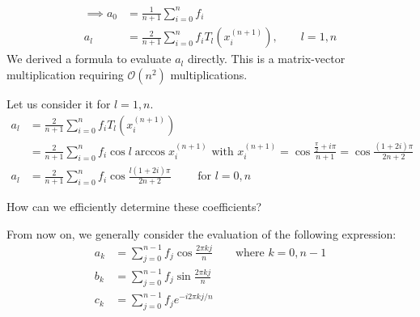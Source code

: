 \documentclass{article}
\begin{document}
\begin{align*}
  \implies a_0 &= \frac{1}{n+1} \sum_{i=0}^n f_i \\
  a_l &= \frac{2}{n+1} \sum_{i=0}^n f_i T_l(x_i^{(n+1)}), \qquad l = 1,n
\end{align*}
We derived a formula to evaluate $a_l$ directly.
This is a matrix-vector multiplication requiring $\mathcal O(n^2)$ multiplications.

Let us consider it for $l=1,n$.
\begin{align*}
  a_l &= \frac{2}{n+1} \sum_{i=0}^n f_i T_l(x_i^{(n+1)}) \\
   &= \frac{2}{n+1} \sum_{i=0}^n f_i \cos{l} \arccos{x_i^{(n+1)}} \text{ with } x_i^{(n+1)} = \cos{\frac{\frac\pi2 + i\pi}{n+1}} = \cos\frac{(1 + 2i)\pi}{2n+2} \\
   a_l &= \frac{2}{n+1} \sum_{i=0}^n f_i \cos\frac{l(1 + 2i)\pi}{2n+2} \qquad \text{ for } l = 0,n
\end{align*}

How can we efficiently determine these coefficients?

From now on, we generally consider the evaluation of the following expression:
\begin{align*}
  a_k &= \sum_{j=0}^{n-1} f_j \cos\frac{2\pi kj}{n} \qquad \text{where } k = 0, n-1 \\
  b_k &= \sum_{j=0}^{n-1} f_j \sin\frac{2\pi kj}{n} \\
  c_k &= \sum_{j=0}^{n-1} f_j e^{-i2\pi kj/n}
\end{align*}
\end{document}
